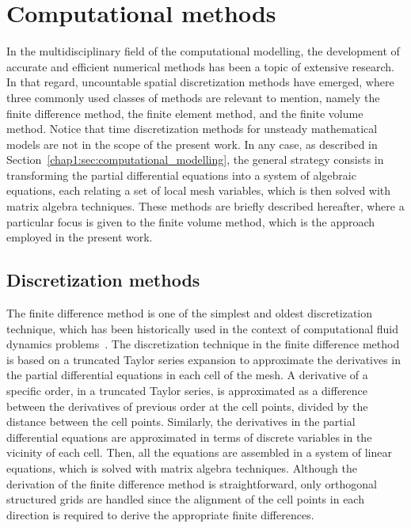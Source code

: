 \section{Computational methods}
\label{chap1:sec:computational_methods}

In the multidisciplinary field of the computational modelling, the development of accurate and efficient numerical methods has been a topic of extensive research.
In that regard, uncountable spatial discretization methods have emerged, where three commonly used classes of methods are relevant to mention, namely the finite difference method, the finite element method, and the finite volume method.
Notice that time discretization methods for unsteady mathematical models are not in the scope of the present work.
In any case, as described in Section~\ref{chap1:sec:computational_modelling}, the general strategy consists in transforming the partial differential equations into a system of algebraic equations, each relating a set of local mesh variables, which is then solved with matrix algebra techniques.
These methods are briefly described hereafter, where a particular focus is given to the finite volume method, which is the approach employed in the present work.

\subsection{Discretization methods}
\label{chap1:subsec:computational_methods_discretization_methods}

The finite difference method is one of the simplest and oldest discretization technique, which has been historically used in the context of computational fluid dynamics problems~\cite{chap1:1998tveito,chap1:1998thomas,chap1:2007grossmann}.
The discretization technique in the finite difference method is based on a truncated Taylor series expansion to approximate the derivatives in the partial differential equations in each cell of the mesh.
A derivative of a specific order, in a truncated Taylor series, is approximated as a difference between the derivatives of previous order at the cell points, divided by the distance between the cell points.
Similarly, the derivatives in the partial differential equations are approximated in terms of discrete variables in the vicinity of each cell.
Then, all the equations are assembled in a system of linear equations, which is solved with matrix algebra techniques.
Although the derivation of the finite difference method is straightforward, only orthogonal structured grids are handled since the alignment of the cell points in each direction is required to derive the appropriate finite differences.

